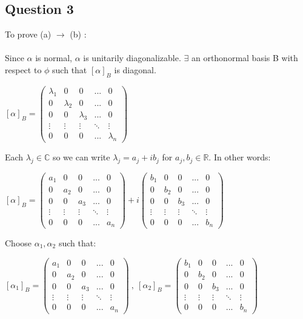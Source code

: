 \documentclass{article}
\begin{document}
\subsection*{Question 3}
To prove (a) $\to$ (b) :\\\\ Since $\alpha$ is normal, $\alpha$ is unitarily diagonalizable. $\exists$ an orthonormal basis B with respect to $\phi$ such that $[\alpha]_B$ is diagonal.\begin{center}$[\alpha]_B=\begin{pmatrix}\lambda_1 & 0 & 0 & ... & 0 \\ 0 & \lambda_2 & 0 & ... & 0 \\ 0 & 0 & \lambda_3 & ... & 0 \\ \vdots & \vdots & \vdots & \ddots & \vdots \\ 0 & 0 & 0 & ... & \lambda_n
\end{pmatrix}$\end{center}
Each $\lambda_j \in \mathbb{C}$ so we can write $\lambda_j = a_j + ib_j$ for $a_j,b_j \in \mathbb{R}.$ In other words:\begin{center}
 $[\alpha]_B=\begin{pmatrix}a_1 & 0 & 0 & ... & 0 \\ 0 & a_2 & 0 & ... & 0 \\ 0 & 0 & a_3 & ... & 0 \\ \vdots & \vdots & \vdots & \ddots & \vdots \\ 0 & 0 & 0 & ... & a_n
\end{pmatrix} + i\begin{pmatrix}b_1 & 0 & 0 & ... & 0 \\ 0 & b_2 & 0 & ... & 0 \\ 0 & 0 & b_3 & ... & 0 \\ \vdots & \vdots & \vdots & \ddots & \vdots \\ 0 & 0 & 0 & ... & b_n
\end{pmatrix}$     
\end{center}
Choose $\alpha_1, \alpha_2$ such that:\begin{center}
 $[\alpha_1]_B=\begin{pmatrix}a_1 & 0 & 0 & ... & 0 \\ 0 & a_2 & 0 & ... & 0 \\ 0 & 0 & a_3 & ... & 0 \\ \vdots & \vdots & \vdots & \ddots & \vdots \\ 0 & 0 & 0 & ... & a_n
\end{pmatrix}\ ,\ [\alpha_2]_B =  \begin{pmatrix}b_1 & 0 & 0 & ... & 0 \\ 0 & b_2 & 0 & ... & 0 \\ 0 & 0 & b_3 & ... & 0 \\ \vdots & \vdots & \vdots & \ddots & \vdots \\ 0 & 0 & 0 & ... & b_n
\end{pmatrix}$  
\end{center}
\end{document}
